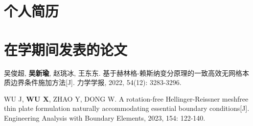 \begin{cv}
    \section*{个人简历}
    \section*{在学期间发表的论文}
    \begin{enumerate}[{[1]}]
        \item 吴俊超, \textbf{吴新瑜}, 赵珧冰, 王东东. 基于赫林格-赖斯纳变分原理的一致高效无网格本质边界条件施加方法[J]. 力学学报, 2022, 54(12): 3283-3296.
        \item WU J, \textbf{WU X}, ZHAO Y, DONG W. A rotation-free Hellinger-Reissner meshfree thin plate formulation naturally accommodating essential boundary conditions[J]. Engineering Analysis with Boundary Elements, 2023, 154: 122-140.
    \end{enumerate}
\end{cv}
